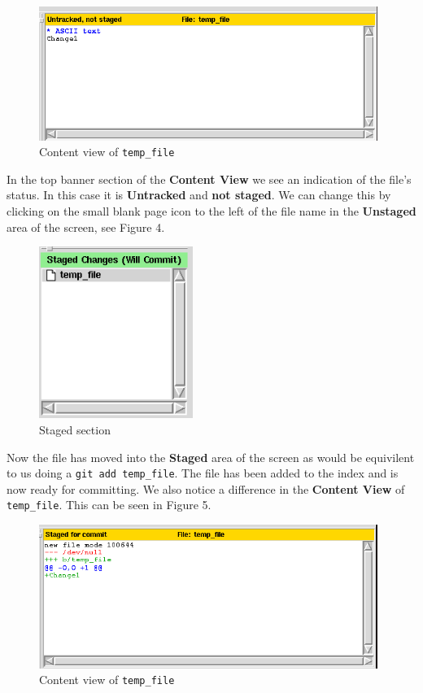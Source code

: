 \begin{figure}[hbt]
\centering
\includegraphics[width=11cm]{images/f-w5-d3.png}
\caption{Content view of \texttt{temp\_file}}
\end{figure}

In the top banner section of the \textbf{Content View} we see an indication of the file's status.  In this case it is \textbf{Untracked} and \textbf{not staged}.  We can change this by clicking on the small blank page icon to the left of the file name in the \textbf{Unstaged} area of the screen, see Figure 4.

\begin{figure}[hbt]
\centering
\includegraphics[width=5cm]{images/f-w5-d4.png}
\caption{Staged section}
\end{figure}

Now the file has moved into the \textbf{Staged} area of the screen as would be equivilent to us doing a \texttt{git add temp\_file}.  The file has been added to the index and is now ready for committing.  We also notice a difference in the \textbf{Content View} of \texttt{temp\_file}.  This can be seen in Figure 5.

\begin{figure}[hbt]
\centering
\includegraphics[width=11cm]{images/f-w5-d5.png}
\caption{Content view of \texttt{temp\_file}}
\end{figure}

